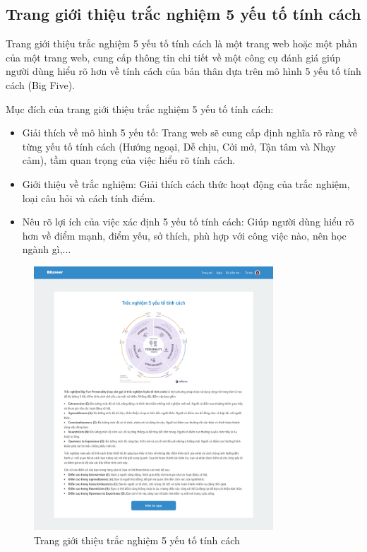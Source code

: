 \subsection{Trang giới thiệu trắc nghiệm 5 yếu tố tính cách}
Trang giới thiệu trắc nghiệm 5 yếu tố tính cách là một trang web hoặc một phần của một trang web, cung cấp thông tin chi tiết về một công cụ đánh giá giúp người dùng hiểu rõ hơn về tính cách của bản thân dựa trên mô hình 5 yếu tố tính cách (Big Five).

Mục đích của trang giới thiệu trắc nghiệm 5 yếu tố tính cách:
\begin{itemize}
    \item Giải thích về mô hình 5 yếu tố: Trang web sẽ cung cấp định nghĩa rõ ràng về từng yếu tố tính cách (Hướng ngoại, Dễ chịu, Cởi mở, Tận tâm và Nhạy cảm), tầm quan trọng của việc hiểu rõ tính cách.
    \item Giới thiệu về trắc nghiệm: Giải thích cách thức hoạt động của trắc nghiệm, loại câu hỏi và cách tính điểm.
    \item Nêu rõ lợi ích của việc xác định 5 yếu tố tính cách: Giúp người dùng hiểu rõ hơn về điểm mạnh, điểm yếu, sở thích, phù hợp với công việc nào, nên học ngành gì,...
\end{itemize}

\begin{figure}[H]
    \centering
    \includegraphics[width=0.8\textwidth]
    {images/chap5/fivePerDetail.png}
    \vspace{0.5cm}
    \caption{Trang giới thiệu trắc nghiệm 5 yếu tố tính cách}
\end{figure}

